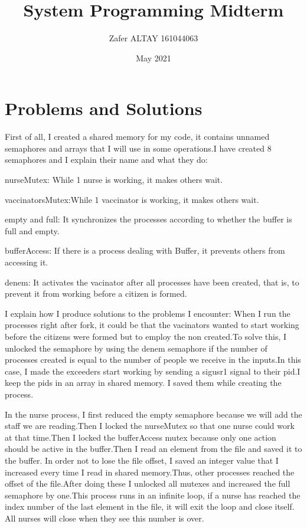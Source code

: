 \documentclass{article}
\title{System Programming Midterm}
\author{Zafer ALTAY 161044063 }
\date{May 2021}
\begin{document}
\maketitle

\section{Problems and Solutions}
First of all, I created a shared memory for my code, it contains unnamed semaphores and arrays that I will use in some operations.I have created 8 semaphores and I explain their name and what they do:

nurseMutex: While 1 nurse is working, it makes others wait.

vaccinatorsMutex:While 1 vaccinator is working, it makes others wait.


empty and full: It synchronizes the processes according to whether the buffer is full and empty.

bufferAccess: If there is a process dealing with Buffer, it prevents others from accessing it.

denem: It activates the vacinator after all processes have been created, that is, to prevent it from working before a citizen is formed.


I explain how I produce solutions to the problems I encounter:
When I run the processes right after fork, it could be that the vacinators wanted to start working before the citizens were formed but to employ the non created.To solve this, I unlocked the semaphore by using the denem semaphore if the number of processes created is equal to the number of people we receive in the inputs.In this case, I made the exceeders start working by sending a sigusr1 signal to their pid.I keep the pids in an array in shared memory. I saved them while creating the process.



In the nurse process, I first reduced the empty semaphore because we will add the staff we are reading.Then I locked the nurseMutex so that one nurse could work at that time.Then I locked the bufferAccess mutex because only one action should be active in the buffer.Then I read an element from the file and saved it to the buffer. In order not to lose the file offset, I saved an integer value that I increased every time I read in shared memory.Thus, other processes reached the offset of the file.After doing these I unlocked all mutexes and increased the full semaphore by one.This process runs in an infinite loop, if a nurse has reached the index number of the last element in the file, it will exit the loop and close itself. All nurses will close when they see this number is over.
\end{document}
